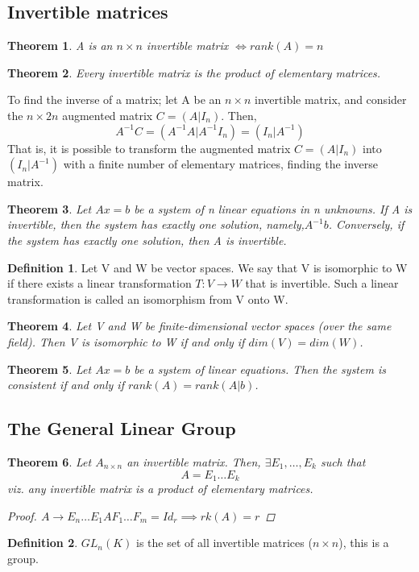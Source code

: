 \documentclass[12pt]{article}
\newtheorem{theorem}{Theorem}[section]
\theoremstyle{definition}
\newtheorem{definition}{Definition}[section]
\theoremstyle{remark}
\begin{document}
\subsection{Invertible matrices}
\begin{theorem}
    A is an $n \times n$ invertible matrix $\iff rank(A) = n$
\end{theorem}
\begin{theorem}
    Every invertible matrix is the product of elementary matrices. 
\end{theorem}
\begin{example}
    To find the inverse of a matrix; let A be an $n\times n$ invertible matrix, and consider the $n \times 2n $ augmented matrix $C = (A | I_n)$. Then, 
    $$A^{-1} C = (A^{-1} A | A^{-1} I_n) =(I_n | A^{-1})$$
    That is, it is possible to transform the augmented matrix $C = (A | I_n)$ into $(I_n | A^{-1})$ with a finite number of elementary matrices, finding the inverse matrix. 
\end{example}
\begin{theorem}
    Let $Ax = b$ be a system of n linear equations in n unknowns. If A is invertible, then the system has exactly 
    one solution, namely,$A^{-1} b$. Conversely, if the system has exactly one solution, then A is invertible.
\end{theorem}
\begin{definition}
    Let V and W be vector spaces. We say that V is isomorphic to W if there exists a linear transformation 
    $T: V \rightarrow W$ that is invertible. Such a linear transformation is called an isomorphism from V onto W.
\end{definition}
\begin{theorem}
    Let V and W be finite-dimensional vector spaces (over the same field). Then V is isomorphic to W if and only if $dim(V) = dim(W)$. 
\end{theorem}
\begin{theorem}
    Let $Ax = b$ be a system of linear equations. Then the system is consistent if and only if $rank(A) = rank(A|b)$.
\end{theorem}
\subsection{The General Linear Group}
\begin{theorem}
    Let $A_{n\times n}$ an invertible matrix. Then, $\exists E_1, \hdots, E_k $ such that 
    $$A = E_1\hdots E_k$$
    viz. any invertible matrix is a product of elementary matrices. 
    \begin{proof}
        $A\rightarrow E_n \hdots E_1 A F_1 \hdots F_m = Id_r \implies rk(A) = r$
    \end{proof}
\end{theorem}
\begin{definition}
    $GL_n(K)$ is the set of all invertible matrices ($n \times n$), this is a group.
\end{definition}
\end{document}
